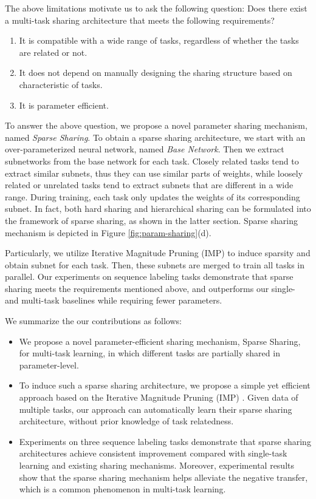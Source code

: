 \documentclass[letterpaper]{article} %
\begin{document}
The above limitations motivate us to ask the following question: Does there exist a multi-task sharing architecture that meets the following requirements?
\begin{enumerate}
\item It is compatible with a wide range of tasks, regardless of whether the tasks are related or not.
\item It does not depend on manually designing the sharing structure based on characteristic of tasks.
\item It is parameter efficient.
\end{enumerate}

To answer the above question, we propose a novel parameter sharing mechanism, named \emph{Sparse Sharing}. To obtain a sparse sharing architecture, we start with an over-parameterized neural network, named \emph{Base Network}. Then we extract subnetworks from the base network for each task. Closely related tasks tend to extract similar subnets, thus they can use similar parts of weights, while loosely related or unrelated tasks tend to extract subnets that are different in a wide range. During training, each task only updates the weights of its corresponding subnet. In fact, both hard sharing and hierarchical sharing can be formulated into the framework of sparse sharing, as shown in the latter section. Sparse sharing mechanism is depicted in Figure \ref{fig:param-sharing}(d).

Particularly, we utilize Iterative Magnitude Pruning (IMP) \cite{DBLP:conf/iclr/FrankleC19} to induce sparsity and obtain subnet for each task. Then, these subnets are merged to train all tasks in parallel. Our experiments on sequence labeling tasks demonstrate that sparse sharing meets the requirements mentioned above, and outperforms our single- and multi-task baselines while requiring fewer parameters.

We summarize the our contributions as follows:
\begin{itemize}
\item We propose a novel parameter-efficient sharing mechanism, Sparse Sharing, for multi-task learning, in which different tasks are partially shared in parameter-level.

\item To induce such a sparse sharing architecture, we propose a simple yet efficient approach based on the Iterative Magnitude Pruning (IMP) \cite{DBLP:conf/iclr/FrankleC19}. Given data of multiple tasks, our approach can automatically learn their sparse sharing architecture, without prior knowledge of task relatedness.

\item Experiments on three sequence labeling tasks demonstrate that sparse sharing architectures achieve consistent improvement compared with single-task learning and existing sharing mechanisms. Moreover, experimental results show that the sparse sharing mechanism helps alleviate the negative transfer, which is a common phenomenon in multi-task learning.
\end{itemize}
\end{document}
